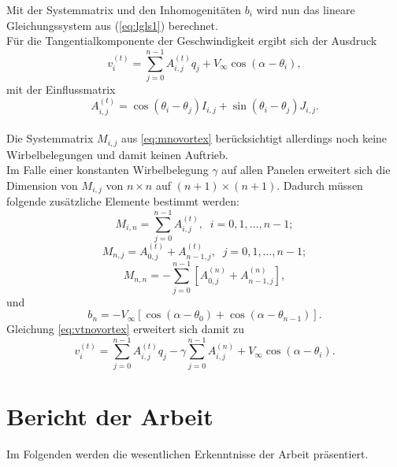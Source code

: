 Mit der Systemmatrix und den Inhomogenitäten $b_i$ wird nun das lineare Gleichungssystem aus (\ref{eq:lgls1}) berechnet. \\
Für die Tangentialkomponente der Geschwindigkeit ergibt sich der Ausdruck
\begin{equation}
\label{eq:vtnovortex}
v_i^{(t)} =  \sum_{j=0}^{n-1} A_{i,j}^{(t)} q_j + V_{\infty} \cos{(\alpha - \theta_i)},
\end{equation}
mit der Einflussmatrix
\begin{equation}
\label{eq:At}
A_{i,j}^{(t)} =  \cos{(\theta _i - \theta _j)} I_{i,j} + \sin{(\theta _i - \theta _j)} J_{i,j}.
\end{equation}
\\
Die Systemmatrix $M_{i,j}$ aus \eqref{eq:mnovortex} berücksichtigt allerdings noch keine Wirbelbelegungen und damit keinen Auftrieb.\\
Im Falle einer konstanten Wirbelbelegung $\gamma$ auf allen Panelen erweitert sich die Dimension von $M_{i,j}$ von $n \times n$ auf $(n+1) \times (n+1)$. Dadurch müssen folgende zusätzliche Elemente bestimmt werden:
\begin{equation}
M_{i,n} =  \sum_{j=0}^{n-1} A_{i,j}^{(t)}, \;\; i=0,1,\ldots, n-1;
\end{equation}
\begin{equation}
M_{n,j} =  A_{0,j}^{(t)} + A_{n-1,j}^{(t)}, \;\; j =0,1,\ldots, n-1;
\end{equation}
\begin{equation}
M_{n,n} =  - \sum_{j=0}^{n-1} \left[ A_{0,j}^{(n)} + A_{n-1,j}^{(n)}\right],
\end{equation}
und
\begin{equation}
b_n =  -V_{\infty} [\cos{(\alpha -\theta_0)} + \cos{(\alpha -\theta _{n-1})}].
\end{equation}
Gleichung \eqref{eq:vtnovortex} erweitert sich damit zu
\begin{equation}
\label{eq:vtvortex}
v_i^{(t)} =  \sum_{j=0}^{n-1} A_{i,j}^{(t)} q_j - \gamma \sum_{j=0}^{n-1}A_{i,j}^{(n)} + V_{\infty} \cos{(\alpha - \theta_i)}.
\end{equation}
\cite{Hess:1966} \cite{Cebeci:1999}
\newpage
\chapter{Bericht der Arbeit}
Im Folgenden werden die wesentlichen Erkenntnisse der Arbeit präsentiert.

